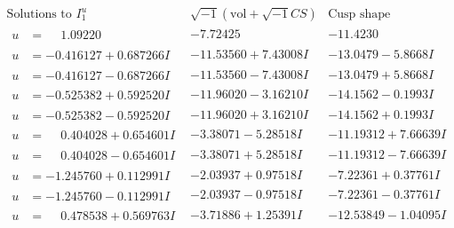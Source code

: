 \documentclass[1p]{elsarticle_modified}
\theoremstyle{definition}
\newcommand{\I}{\sqrt{-1}}
\begin{document}
$$\begin{array}{c|c|c}  
\text{Solutions to }I^u_{1}& \I (\text{vol} + \sqrt{-1}CS) & \text{Cusp shape}\\
 \hline 
\begin{aligned}
u &= \phantom{-}1.09220\phantom{ +0.000000I}\end{aligned}
 & -7.72425\phantom{ +0.000000I} & -11.4230\phantom{ +0.000000I} \\ \hline\begin{aligned}
u &= -0.416127 + 0.687266 I\end{aligned}
 & -11.53560 + 7.43008 I & -13.0479 - 5.8668 I \\ \hline\begin{aligned}
u &= -0.416127 - 0.687266 I\end{aligned}
 & -11.53560 - 7.43008 I & -13.0479 + 5.8668 I \\ \hline\begin{aligned}
u &= -0.525382 + 0.592520 I\end{aligned}
 & -11.96020 - 3.16210 I & -14.1562 - 0.1993 I \\ \hline\begin{aligned}
u &= -0.525382 - 0.592520 I\end{aligned}
 & -11.96020 + 3.16210 I & -14.1562 + 0.1993 I \\ \hline\begin{aligned}
u &= \phantom{-}0.404028 + 0.654601 I\end{aligned}
 & -3.38071 - 5.28518 I & -11.19312 + 7.66639 I \\ \hline\begin{aligned}
u &= \phantom{-}0.404028 - 0.654601 I\end{aligned}
 & -3.38071 + 5.28518 I & -11.19312 - 7.66639 I \\ \hline\begin{aligned}
u &= -1.245760 + 0.112991 I\end{aligned}
 & -2.03937 + 0.97518 I & -7.22361 + 0.37761 I \\ \hline\begin{aligned}
u &= -1.245760 - 0.112991 I\end{aligned}
 & -2.03937 - 0.97518 I & -7.22361 - 0.37761 I \\ \hline\begin{aligned}
u &= \phantom{-}0.478538 + 0.569763 I\end{aligned}
 & -3.71886 + 1.25391 I & -12.53849 - 1.04095 I \\ \hline\begin{aligned}

\end{aligned}
\end{array}$$
\end{document}
